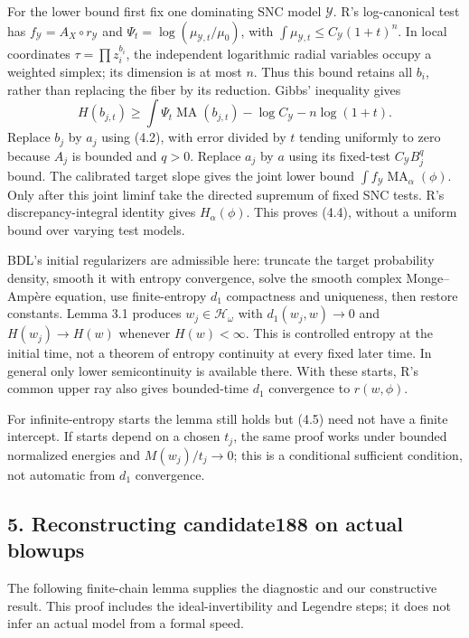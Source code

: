 \documentclass[
  11pt,
]{article}
\begin{document}
For the lower bound first fix one dominating SNC model \(\mathcal Y\).
R's log-canonical test has \(f_\mathcal Y=A_X\circ r_\mathcal Y\) and
\(\Psi_t=\log(\mu_{\mathcal Y,t}/\mu_0)\), with
\(\int\mu_{\mathcal Y,t}\leq C_\mathcal Y(1+t)^n\). In local coordinates
\(\tau=\prod z_i^{b_i}\), the independent logarithmic radial variables
occupy a weighted simplex; its dimension is at most \(n\). Thus this
bound retains all \(b_i\), rather than replacing the fiber by its
reduction. Gibbs' inequality gives \[
 H(b_{j,t})\geq\int\Psi_t\operatorname{MA}(b_{j,t})
                         -\log C_\mathcal Y-n\log(1+t).
\] Replace \(b_j\) by \(a_j\) using (4.2), with error divided by \(t\)
tending uniformly to zero because \(A_j\) is bounded and \(q>0\).
Replace \(a_j\) by \(a\) using its fixed-test \(C_\mathcal YB_j^q\)
bound. The calibrated target slope gives the joint lower bound
\(\int f_\mathcal Y\operatorname{MA}_\alpha(\phi)\). Only after this
joint liminf take the directed supremum of fixed SNC tests. R's
discrepancy-integral identity gives \(H_\alpha(\phi)\). This proves
(4.4), without a uniform bound over varying test models.

BDL's initial regularizers are admissible here: truncate the target
probability density, smooth it with entropy convergence, solve the
smooth complex Monge--Ampère equation, use finite-entropy \(d_1\)
compactness and uniqueness, then restore constants. Lemma 3.1 produces
\(w_j\in\mathcal H_\omega\) with \(d_1(w_j,w)\to0\) and
\(H(w_j)\to H(w)\) whenever \(H(w)<\infty\). This is controlled entropy
at the initial time, not a theorem of entropy continuity at every fixed
later time. In general only lower semicontinuity is available there.
With these starts, R's common upper ray also gives bounded-time \(d_1\)
convergence to \(r(w,\phi)\).

For infinite-entropy starts the lemma still holds but (4.5) need not
have a finite intercept. If starts depend on a chosen \(t_j\), the same
proof works under bounded normalized energies and \(M(w_j)/t_j\to0\);
this is a conditional sufficient condition, not automatic from \(d_1\)
convergence.

\subsection{5. Reconstructing candidate188 on actual
blowups}\label{reconstructing-candidate188-on-actual-blowups}

The following finite-chain lemma supplies the diagnostic and our
constructive result. This proof includes the ideal-invertibility and
Legendre steps; it does not infer an actual model from a formal speed.
\end{document}
